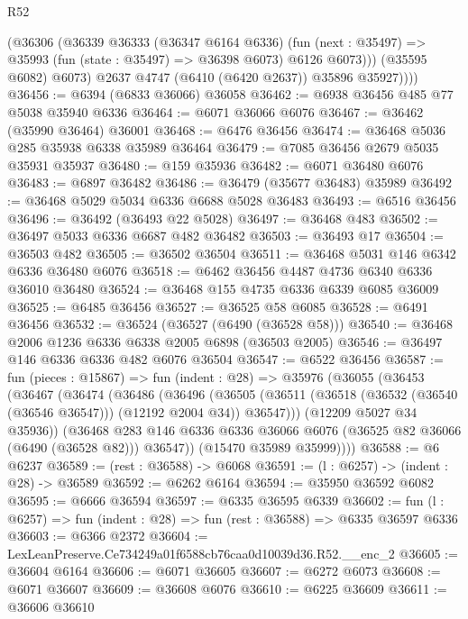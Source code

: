 \begin{lexlean}{R52}
\begin{coremodule}
              (@36306
                (@36339
                  @36333
                  (@36347 @6164 @6336)
                  (fun (next : @35497) =>
                  @35993 (fun (state : @35497) => @36398 @6073) @6126 @6073)))
              (@35595 @6082)
              @6073)
            @2637
            @4747
            (@6410 (@6420 @2637))
            @35896
            @35927))))
@36456 := @6394 (@6833 @36066) @36058
@36462 := @6938 @36456 @485 @77 @5038 @35940 @6336
@36464 := @6071 @36066 @6076
@36467 := @36462 (@35990 @36464) @36001
@36468 := @6476 @36456
@36474 := @36468 @5036 @285 @35938 @6338 @35989 @36464
@36479 := @7085 @36456 @2679 @5035 @35931 @35937
@36480 := @159 @35936
@36482 := @6071 @36480 @6076
@36483 := @6897 @36482
@36486 := @36479 (@35677 @36483) @35989
@36492 := @36468 @5029 @5034 @6336 @6688 @5028 @36483
@36493 := @6516 @36456
@36496 := @36492 (@36493 @22 @5028)
@36497 := @36468 @483
@36502 := @36497 @5033 @6336 @6687 @482 @36482
@36503 := @36493 @17
@36504 := @36503 @482
@36505 := @36502 @36504
@36511 := @36468 @5031 @146 @6342 @6336 @36480 @6076
@36518 := @6462 @36456 @4487 @4736 @6340 @6336 @36010 @36480
@36524 := @36468 @155 @4735 @6336 @6339 @6085 @36009
@36525 := @6485 @36456
@36527 := @36525 @58 @6085
@36528 := @6491 @36456
@36532 := @36524 (@36527 (@6490 (@36528 @58)))
@36540 := @36468 @2006 @1236 @6336 @6338 @2005 @6898 (@36503 @2005)
@36546 := @36497 @146 @6336 @6336 @482 @6076 @36504
@36547 := @6522 @36456
@36587 := fun (pieces : @15867) =>
  fun (indent : @28) =>
  @35976
    (@36055
      (@36453
        (@36467
          (@36474
            (@36486
              (@36496
                (@36505
                  (@36511 (@36518 (@36532 (@36540 (@36546 @36547))) (@12192 @2004 @34)) @36547)))
              (@12209 @5027 @34 @35936))
            (@36468
              @283
              @146
              @6336
              @6336
              @36066
              @6076
              (@36525 @82 @36066 (@6490 (@36528 @82)))
              @36547))
          (@15470 @35989 @35999))))
@36588 := @6 @6237
@36589 := (rest : @36588) -> @6068
@36591 := (l : @6257) -> (indent : @28) -> @36589
@36592 := @6262 @6164
@36594 := @35950 @36592 @6082
@36595 := @6666 @36594
@36597 := @6335 @36595 @6339
@36602 := fun (l : @6257) => fun (indent : @28) => fun (rest : @36588) => @6335 @36597 @6336
@36603 := @6366 @2372
@36604 := LexLeanPreserve.Ce734249a01f6588cb76caa0d10039d36.R52.__enc_2
@36605 := @36604 @6164
@36606 := @6071 @36605
@36607 := @6272 @6073
@36608 := @6071 @36607
@36609 := @36608 @6076
@36610 := @6225 @36609
@36611 := @36606 @36610

\end{coremodule}
\end{lexlean}
